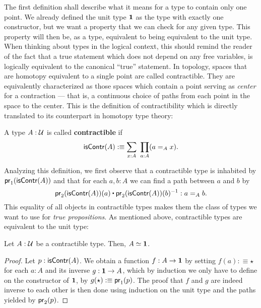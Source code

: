 The first definition shall describe what it means for a type to contain only one
point.
We already defined the unit type $\mathbf{1}$ as the type with exactly one constructor,
but we want a property that we can check for any given type.
This property will then be, as a type, equivalent to being equivalent to the unit
type.
When thinking about types in the logical context, this should remind the reader
of the fact that a true statement which does not depend on any free variables,
is logically equivalent to the canonical ``true'' statement.
In topology, spaces that are homotopy equivalent to a single point are called
contractible.
They are equivalently characterized as those spaces which contain a point serving
as \emph{center} for a contraction --- that is, a continuous choice of paths from each
point in the space to the center.
This is the definition of contractibility which is directly translated to
its counterpart in homotopy type theory:
\begin{defn}[Contractibility]
A type $A : \mathcal{U}$ is called \textbf{contractible} if
\begin{equation*}
\mathsf{isContr}(A) :\equiv \sum_{x : A} ~ \prod_{a : A} (a =_A x) \text{.}
\end{equation*}
\end{defn}

Analyzing this definition, we first observe that a contractible type is inhabited
by $\mathsf{pr}_1(\mathsf{isContr}(A))$ and that for each $a, b : A$ we can find a path between
$a$ and $b$ by
\begin{equation*}
\pr_2(\isContr(A))(a) \ct \pr_2(\isContr(A))(b)\inv : a =_A b \text{.}
\end{equation*}
This equality of all objects in contractible types makes them the class of types
we want to use for \emph{true propositions}.
As mentioned above, contractible types are equivalent to the unit type:

\begin{lemma}
Let $A : \mathcal{U}$ be a contractible type. Then, $A \simeq \mathbf{1}$.
\end{lemma}

\begin{proof}
Let $p : \mathsf{isContr}(A)$.
We obtain a function $f : A \to \mathbf{1}$ by setting $f(a) :\equiv \star$ for each
$a : A$ and its inverse $g : \mathbf{1} \to A$, which by induction we only have to
define on the constructor of $\mathbf{1}$, by $g(\star) :\equiv \mathsf{pr}_1(p)$.
The proof that $f$ and $g$ are indeed inverse to each other is then done
using induction on the unit type and the paths yielded by $\mathsf{pr}_2(p)$.
\end{proof}

